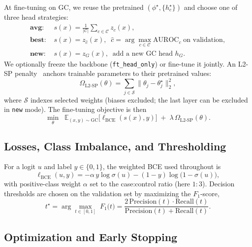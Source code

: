 \documentclass[journal,article,submit,pdftex,moreauthors]{Definitions/mdpi}
\begin{document}
At fine-tuning on GC, we reuse the pretrained $(\phi^\star,\{h_c^\star\})$ and choose one of three head strategies:
\begin{align}
\textbf{avg: } & s(x)=\tfrac{1}{|\mathcal{C}|}\sum_{c\in\mathcal{C}} z_c(x), \nonumber\\
\textbf{best: } & s(x)=z_{\hat{c}}(x), \;\; \hat{c}=\arg\max_{c\in\mathcal{C}}\mathrm{AUROC}_c\; \text{on validation}, \nonumber\\
\textbf{new: } & s(x)=z_G(x), \;\; \text{add a new GC head } h_G. \nonumber
\end{align}
We optionally freeze the backbone (\texttt{ft\_head\_only}) or fine-tune it jointly. An L2-SP penalty~\citep{Li2018_L2SP} anchors trainable parameters to their pretrained values:
\begin{equation}
\label{eq:l2sp}
\Omega_{\mathrm{L2\text{-}SP}}(\theta)=\!\!\sum_{j\in \mathcal{S}}\!\!\|\theta_j-\theta_j^\star\|_2^2,
\end{equation}
where $\mathcal{S}$ indexes selected weights (biases excluded; the last layer can be excluded in \texttt{new} mode). The fine-tuning objective is then
\begin{equation}
\label{eq:finetune}
\min_{\theta}\;\; \mathbb{E}_{(x,y)\sim \text{GC}}\!\Big[\ell_{\mathrm{BCE}}(s(x),y)\Big] \;+\; \lambda\, \Omega_{\mathrm{L2\text{-}SP}}(\theta).
\end{equation}

\subsection{Losses, Class Imbalance, and Thresholding}

For a logit $u$ and label $y\!\in\!\{0,1\}$, the weighted BCE used throughout is
\begin{equation}
\ell_{\mathrm{BCE}}(u,y)= -\alpha\, y\log\sigma(u) - (1-y)\log\big(1-\sigma(u)\big),
\end{equation}
with positive-class weight $\alpha$ set to the case:control ratio (here $1{:}3$). Decision thresholds are chosen on the validation set by maximizing the $F_1$-score,
\begin{equation}
t^\star=\arg\max_{t\in[0,1]}\; F_1\!\big(t\big)=\frac{2\,\mathrm{Precision}(t)\cdot\mathrm{Recall}(t)}{\mathrm{Precision}(t)+\mathrm{Recall}(t)}.
\end{equation}

\subsection{Optimization and Early Stopping}
\end{document}
